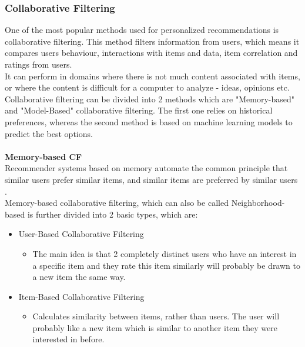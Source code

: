 \documentclass[\myFontSize,oneside,english,hidelinks,a4paper]{article}
\begin{document}
\subsubsection{Collaborative Filtering}
One of the most popular methods used for personalized recommendations is collaborative filtering. This method filters information from users, which means it compares users behaviour, interactions with items and data, item correlation and ratings from users. \\
It can perform in domains where there is not much content associated with items, or where the content is difficult for a computer to analyze - ideas, opinions etc.\cite{melville:aaai02}\\
Collaborative filtering can be divided into 2 methods which are "Memory-based" and "Model-Based" collaborative filtering. The first one relies on historical preferences, whereas the second method is based on machine learning models to predict the best options.\\\\
%
\textbf{Memory-based CF}\\
Recommender systems based on memory automate the common principle that similar users prefer similar items, and similar items are preferred by similar users \cite{Ning201537}. \\
Memory-based collaborative filtering, which can also be called Neighborhood-based is further divided into 2 basic types, which are:
\begin{itemize}
\item User-Based Collaborative Filtering
	\begin{itemize}
	\item The main idea is that 2 completely distinct users who have an interest in a specific item and they rate this item similarly will probably be drawn to a new item the same way.
	\end{itemize}
\item Item-Based Collaborative Filtering
	\begin{itemize}
	\item Calculates similarity between items, rather than users. The user will probably like a new item which is similar to another item they were interested in before.\\
	\end{itemize}
\end{itemize}
%
%
\end{document}
